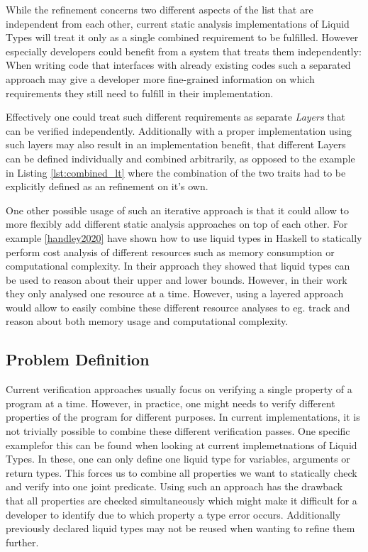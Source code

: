 While the refinement concerns two different aspects of the list that are independent from each other, current static analysis implementations of Liquid Types will treat it only as a single combined requirement to be fulfilled. However especially developers could benefit from a system that treats them independently: When writing code that interfaces with already existing codes such a separated approach may give a developer more fine-grained information on which requirements they still need to fulfill in their implementation.

Effectively one could treat such different requirements as separate \textit{Layers} that can be verified independently. Additionally with a proper implementation using such layers may also result in an implementation benefit, that different Layers can be defined individually and combined arbitrarily, as opposed to the example in Listing \ref{lst:combined_lt} where the combination of the two traits had to be explicitly defined as an refinement on it's own.

One other possible usage of such an iterative approach is that it could allow to more flexibly add different static analysis approaches on top of each other. For example \ref{handley2020} have shown how to use liquid types in Haskell to statically perform cost analysis of different resources such as memory consumption or computational complexity. In their approach they showed that liquid types can be used to reason about their upper and lower bounds. However, in their work they only analysed one resource at a time. However, using a layered approach would allow to easily combine these different resource analyses to eg. track and reason about both memory usage and computational complexity.

\subsection{Problem Definition}
\label{ssec:problem_definition}

Current verification approaches usually focus on verifying a single property of a program at a time. However, in practice, one might needs to verify different properties of the program for different purposes. In current implementations, it is not trivially possible to combine these different verification passes. One specific examplefor this can be found when looking at current implemetnations of Liquid Types. In these, one can only define one liquid type for variables, arguments or return types. This forces us to combine all properties we want to statically check and verify into one joint predicate. Using such an approach has the drawback that all properties are checked simultaneously which might make it difficult for a developer to identify due to which property a type error occurs. Additionally previously declared liquid types may not be reused when wanting to refine them further.


